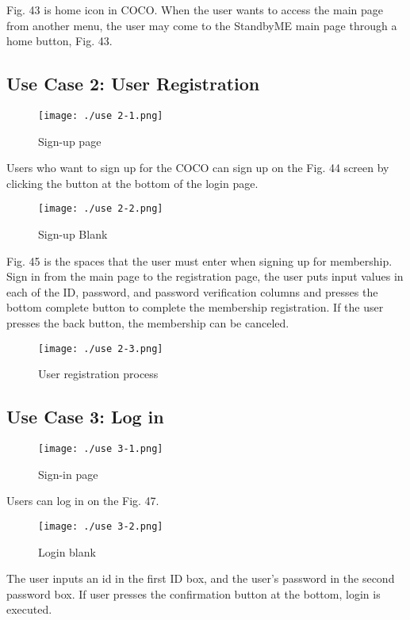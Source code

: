 \documentclass[conference]{IEEEtran}
\begin{document}
Fig. 43 is home icon in COCO. When the user wants to access the main page from another menu, the user may come to the StandbyME main page through a home button, Fig. 43.

\subsection{Use Case 2: User Registration}

\begin{figure}[H]
\texttt{[image: ./use 2-1.png]}
\centering
\caption{Sign-up page}
\end{figure}

Users who want to sign up for the COCO can sign up on the Fig. 44 screen by clicking the button at the bottom of the login page.

\begin{figure}[H]
\texttt{[image: ./use 2-2.png]}
\centering
\caption{Sign-up Blank}
\end{figure}

Fig. 45 is the spaces that the user must enter when signing up for membership. Sign in from the main page to the registration page, the user puts input values in each of the ID, password, and password verification columns and presses the bottom complete button to complete the membership registration. If the user presses the back button, the membership can be canceled.

\begin{figure}[H]
\texttt{[image: ./use 2-3.png]}
\centering
\caption{User registration process}
\end{figure}

\subsection{Use Case 3: Log in}

\begin{figure}[H]
\texttt{[image: ./use 3-1.png]}
\centering
\caption{Sign-in page}
\end{figure}

Users can log in on the Fig. 47.

\begin{figure}[H]
\texttt{[image: ./use 3-2.png]}
\centering
\caption{Login blank}
\end{figure}

The user inputs an id in the first ID box, and the user's password in the second password box. If user presses the confirmation button at the bottom, login is executed.
\end{document}
